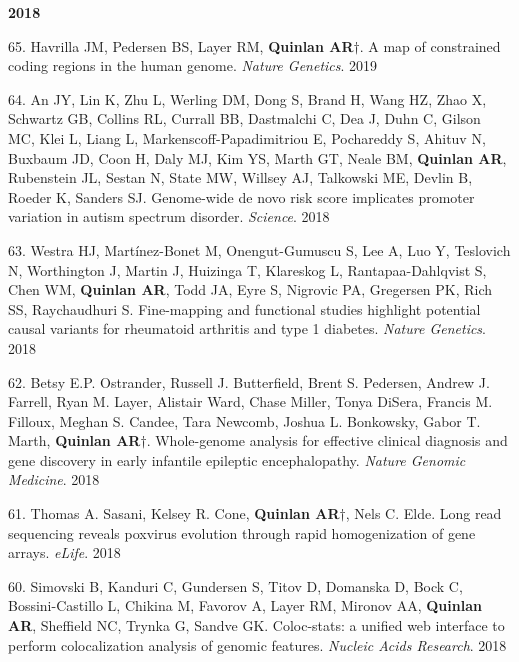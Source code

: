 \documentclass[margin,line]{cv}
\begin{document}
\begin{resume}
    \textbf{2018} \\

    \begin{list}{*}{}

    \item[65.] Havrilla JM, Pedersen BS, Layer RM, \textbf{   Quinlan AR}$\dagger$. A map of constrained coding regions in the human genome. \emph{Nature Genetics}. 2019


    \item[64.] An JY, Lin K, Zhu L, Werling DM, Dong S, Brand H, Wang HZ, Zhao X, Schwartz GB, Collins RL, Currall BB, Dastmalchi C, Dea J, Duhn C, Gilson MC, Klei L, Liang L, Markenscoff-Papadimitriou E, Pochareddy S, Ahituv N, Buxbaum JD, Coon H, Daly MJ, Kim YS, Marth GT, Neale BM, \textbf{Quinlan AR}, Rubenstein JL, Sestan N, State MW, Willsey AJ, Talkowski ME, Devlin B, Roeder K, Sanders SJ. Genome-wide de novo risk score implicates promoter variation in autism spectrum disorder. \emph{Science}. 2018

    \item[63.] Westra HJ, Martínez-Bonet M, Onengut-Gumuscu S, Lee A, Luo Y, Teslovich N, Worthington J, Martin J, Huizinga T, Klareskog L, Rantapaa-Dahlqvist S, Chen WM, \textbf{Quinlan AR}, Todd JA, Eyre S, Nigrovic PA, Gregersen PK, Rich SS, Raychaudhuri S. Fine-mapping and functional studies highlight potential causal variants for rheumatoid arthritis and type 1 diabetes. \emph{Nature Genetics}. 2018

    \item[62.] Betsy E.P. Ostrander, Russell J. Butterfield, Brent S. Pedersen, Andrew J. Farrell, Ryan M. Layer, Alistair Ward, Chase Miller, Tonya DiSera, Francis M. Filloux, Meghan S. Candee, Tara Newcomb, Joshua L. Bonkowsky, Gabor T. Marth, \textbf{Quinlan AR}$\dagger$. Whole-genome analysis for effective clinical diagnosis and gene discovery in early infantile epileptic encephalopathy. \emph{Nature Genomic Medicine}. 2018

    \item[61.] Thomas A. Sasani, Kelsey R. Cone, \textbf{Quinlan AR}$\dagger$, Nels C. Elde. Long read sequencing reveals poxvirus evolution through rapid homogenization of gene arrays. \emph{eLife}. 2018

    \item[60.] Simovski B, Kanduri C, Gundersen S, Titov D, Domanska D, Bock C, Bossini-Castillo L, Chikina M, Favorov A, Layer RM, Mironov AA, \textbf{Quinlan AR}, Sheffield NC, Trynka G, Sandve GK. Coloc-stats: a unified web interface to perform colocalization analysis of genomic features. \emph{Nucleic Acids Research}. 2018 


\end{list}
\end{resume}
\end{document}
